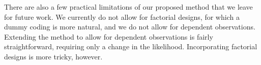 \documentclass[11pt,a4paper]{article}
\theoremstyle{definition} %
\theoremstyle{case}
\begin{document}
There are also a few practical limitations of our proposed method that we leave for future work. We currently do not allow for factorial designs, for which a dummy coding is more natural, and we do not allow for dependent observations. Extending the method to allow for dependent observations is fairly straightforward, requiring only a change in the likelihood. Incorporating factorial designs is more tricky, however.

\end{document}
